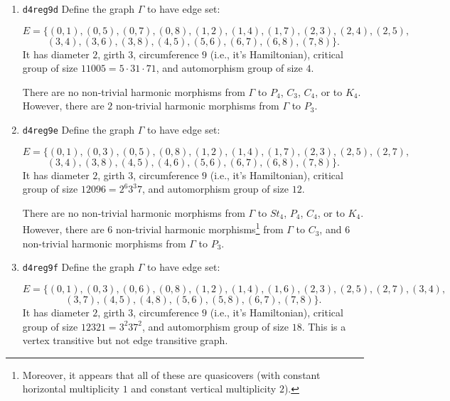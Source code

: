 \documentclass[12pt,letterpaper]{article}
\theoremstyle{definition}
\begin{document}
\begin{enumerate}
There are no non-trivial harmonic morphisms from $\Gamma$ to $St_4$,
$P_3$, $P_4$, $C_4$, or to $K_4$.  However, there
are $6$ non-trivial harmonic morphisms from $\Gamma$ to $C_3$. 

\item
{\tt d4reg9d}\newline
Define the graph $\Gamma$ to have edge set:

\[
E = \{
(0, 1), (0, 5), (0, 7), (0, 8), (1, 2), (1, 4), (1, 7), (2, 3), (2, 4), (2, 5),
\]
\[
(3, 4), (3, 6), (3, 8), (4, 5), (5, 6), (6, 7), (6, 8), (7, 8)
\}.
\]
It has diameter $2$,
girth $3$, circumference $9$ (i.e., it's Hamiltonian),
critical group of size $11005 = 5\cdot 31\cdot 71$, 
and automorphism group of size $4$.

There are no non-trivial harmonic morphisms from $\Gamma$ to
$P_4$, $C_3$, $C_4$, or to $K_4$. However, there are $2$ non-trivial harmonic
morphisms from $\Gamma$ to $P_3$. 


\item
{\tt d4reg9e}\newline  
Define the graph $\Gamma$ to have edge set:

\[
E = \{
(0, 1), (0, 3), (0, 5), (0, 8), (1, 2), (1, 4), (1, 7), (2, 3), (2, 5), (2, 7),
\]
\[
 (3, 4), (3, 8), (4, 5), (4, 6), (5, 6), (6, 7), (6, 8), (7, 8)
\}.
\]
It has diameter $2$,
girth $3$, circumference $9$ (i.e., it's Hamiltonian),
critical group of size $12096 = 2^6 3^3 7$, 
and automorphism group of size $12$.

There are no non-trivial harmonic morphisms from $\Gamma$ to $St_4$,
$P_4$, $C_4$, or to $K_4$. However,
there are $6$ non-trivial harmonic
morphisms\footnote{Moreover,
  it appears that all of these are quasicovers
  (with constant horizontal multiplicity $1$ and constant vertical
  multiplicity $2$).}
from $\Gamma$ to $C_3$,
and $6$ non-trivial harmonic morphisms from $\Gamma$ to $P_3$.


\item
{\tt d4reg9f}\newline    
  Define the graph $\Gamma$
  to have edge set:

\[
E = \{
(0, 1), (0, 3), (0, 6), (0, 8), (1, 2), (1, 4), (1, 6), (2, 3), (2, 5), (2, 7), (3, 4),
\]
\[
(3, 7), (4, 5), (4, 8), (5, 6), (5, 8), (6, 7), (7, 8)
\}.
\]
It has diameter $2$,
girth $3$, circumference $9$ (i.e., it's Hamiltonian),
critical group of size $12321 = 3^2 37^2$, 
and automorphism group of size $18$.
This is a vertex transitive but not edge transitive graph.


\end{enumerate}
\end{document}
